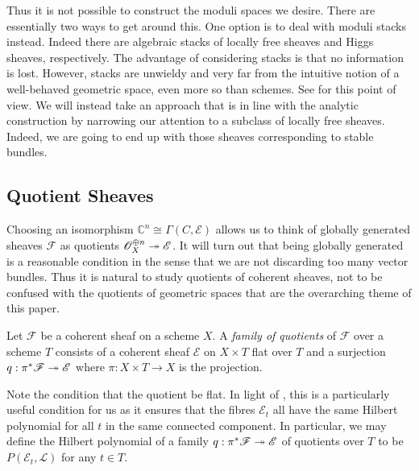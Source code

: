 \documentclass[12pt]{ociamthesis}  %
\begin{document}
Thus it is not possible to construct the moduli spaces we desire.
There are essentially two ways to get around this. One option is to deal with
moduli stacks instead. Indeed there are algebraic stacks of locally
free sheaves and Higgs sheaves, respectively. The advantage of
considering stacks is that no information is lost. However, stacks
are unwieldy and very far from the intuitive notion of a well-behaved
geometric space, even more so than schemes. See \cite{cm2017} for this point of view.
We will instead take an
approach that is in line with the analytic construction by narrowing
our attention to a subclass of locally free sheaves. Indeed, we are
going to end up with those sheaves corresponding to stable
bundles.

\subsection{Quotient Sheaves}

Choosing an isomorphism $\mathbb C^n \cong \Gamma(C,\mathscr E)$
allows us to think of globally generated sheaves $\mathscr F$
as quotients $\mathscr O_X^{\oplus n} \twoheadrightarrow \mathscr E$.
It will turn out that being globally generated is a reasonable
condition in the sense that we are not discarding too many
vector bundles. Thus it is natural to study quotients of coherent sheaves,
not to be confused with the quotients of geometric spaces that
are the overarching theme of this paper.

\begin{definition}
  Let $\mathscr F$ be a coherent sheaf on a scheme $X$.
  A \emph{family of quotients} of $\mathscr F$ over a scheme $T$
  consists of a coherent sheaf $\mathscr E$ on $X\times T$ flat over $T$ and a
  surjection $q:\pi^*\mathscr F\twoheadrightarrow\mathscr E$ where
  $\pi : X\times T \to X$ is the projection.
\end{definition}

Note the condition that the quotient be flat. 
In light of \cite[III Theorem 9.9]{hartshorne1977}, this is a
particularly useful condition for us as it ensures that the fibres
$\mathscr E_t$ all have the same Hilbert polynomial
for all $t$ in the same connected component. In particular,
we may define the Hilbert polynomial of a family
$q : \pi^*\mathscr F \twoheadrightarrow \mathscr E$ of quotients over $T$ to be
$P(\mathscr E_t,\mathscr L)$ for any $t\in T$.
\end{document}

